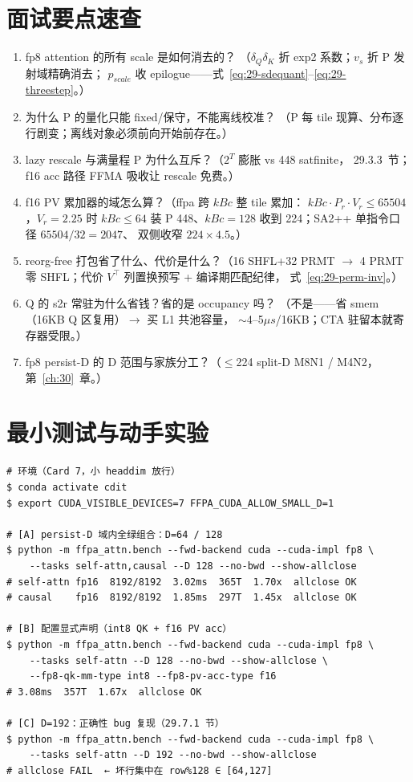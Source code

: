 \section{面试要点速查}

\begin{enumerate}[itemsep=1pt,topsep=2pt]
  \item fp8 attention 的所有 scale 是如何消去的？
        （$\delta_Q\delta_K$ 折 exp2 系数；$v_s$ 折 P 发射域精确消去；
        $p_{scale}$ 收 epilogue——式~\ref{eq:29-sdequant}--\ref{eq:29-threestep}。）
  \item 为什么 P 的量化只能 fixed/保守，不能离线校准？
        （P 每 tile 现算、分布逐行剧变；离线对象必须前向开始前存在。）
  \item lazy rescale 与满量程 P 为什么互斥？（$2^T$ 膨胀 vs 448 satfinite，
        29.3.3~节；f16 acc 路径 FFMA 吸收让 rescale 免费。）
  \item f16 PV 累加器的域怎么算？（ffpa 跨 $kBc$ 整 tile 累加：
        $kBc\cdot P_r\cdot V_r\le65504$，$V_r=2.25$ 时 $kBc{\le}64$ 装
        P 448、$kBc{=}128$ 收到 224；SA2++ 单指令口径 $65504/32=2047$、
        双侧收窄 $224\times4.5$。）
  \item reorg-free 打包省了什么、代价是什么？（16 SHFL+32 PRMT $\to$
        4 PRMT 零 SHFL；代价 $V^{\top}$ 列置换预写 + 编译期匹配纪律，
        式~\ref{eq:29-perm-inv}。）
  \item Q 的 s2r 常驻为什么省钱？省的是 occupancy 吗？
        （不是——省 smem（16KB Q 区复用）$\to$ 买 L1 共池容量，
        $\sim$4--5$\mu s$/16KB；CTA 驻留本就寄存器受限。）
  \item fp8 persist-D 的 D 范围与家族分工？（$\le$224 %
        split-D M8N1 / M4N2，第~\ref{ch:30}~章。）
\end{enumerate}

\section{最小测试与动手实验}

\begin{lstlisting}[style=console]
# 环境（Card 7，小 headdim 放行）
$ conda activate cdit
$ export CUDA_VISIBLE_DEVICES=7 FFPA_CUDA_ALLOW_SMALL_D=1

# [A] persist-D 域内全绿组合：D=64 / 128
$ python -m ffpa_attn.bench --fwd-backend cuda --cuda-impl fp8 \
    --tasks self-attn,causal --D 128 --no-bwd --show-allclose
# self-attn fp16  8192/8192  3.02ms  365T  1.70x  allclose OK
# causal    fp16  8192/8192  1.85ms  297T  1.45x  allclose OK

# [B] 配置显式声明（int8 QK + f16 PV acc）
$ python -m ffpa_attn.bench --fwd-backend cuda --cuda-impl fp8 \
    --tasks self-attn --D 128 --no-bwd --show-allclose \
    --fp8-qk-mm-type int8 --fp8-pv-acc-type f16
# 3.08ms  357T  1.67x  allclose OK

# [C] D=192：正确性 bug 复现（29.7.1 节）
$ python -m ffpa_attn.bench --fwd-backend cuda --cuda-impl fp8 \
    --tasks self-attn --D 192 --no-bwd --show-allclose
# allclose FAIL  ← 坏行集中在 row%128 ∈ [64,127]
\end{lstlisting}

